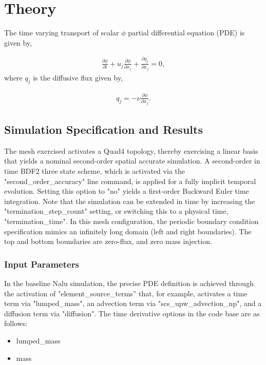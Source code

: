 \documentclass{article}
\begin{document}
\section{Theory}
The time varying transport of scalar $\phi$ partial differential equation (PDE) is given by,

\begin{align}
  \frac {\partial \phi }{\partial t} + u_j \frac{ \partial \phi }{\partial x_j} + \frac{\partial q_j}{\partial x_j} = 0,
\label{eq:contEq}
\end{align} 
where $q_j$ is the diffusive flux given by,

\begin{align}
  q_j = -\nu \frac{\partial \phi}{\partial x_j}.
\label{eq:momEq}
\end{align}

\subsection{Simulation Specification and Results}

The mesh exercised activates a Quad4 topology, thereby exercising a
linear basis that yields a nominal second-order spatial accurate
simulation. A second-order in time BDF2 three state scheme, which is activated via the "second\_order\_accuracy" line command, is applied for a fully implicit
temporal evolution. Setting this option to "no" yields a first-order Backward Euler time integration. Note that the simulation can be extended in time by increasing the "termination\_step\_count" setting, or switching this to a physical time, "termination\_time". In this mesh configuration, the periodic boundary condition specification
mimics an infinitely long domain (left and right boundaries). The top and bottom boundaries are zero-flux, and zero mass injection.

\subsubsection{Input Parameters}
In the baseline Nalu simulation, the precise PDE definition is achieved through the activation of  "element\_source\_terms'' that, for example, activates a time term via "lumped\_mass", an advection term via "scs\_upw\_advection\_np", and a diffusion term via "diffusion".
%
The time derivative options in the code base are as follows:
\begin{itemize}
    \item lumped\_mass
    \item mass
\end{itemize}
\end{document}
